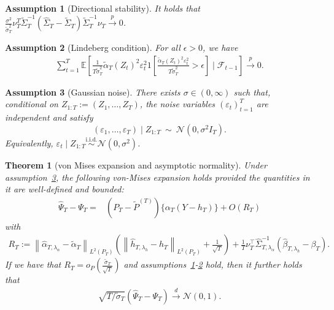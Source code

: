 \documentclass[11pt]{article}
\newtheorem{thm}{Theorem}
\newtheorem{assum}{Assumption}
\begin{document}
\begin{assum}[Directional stability]
\label{ass: directional_stab_vme}
    It holds that $\frac{\sigma^2}{\widetilde{\sigma}_T^2}\nu_T^{T}\widetilde{\Sigma}_T^{-1}(\widehat{\Sigma}_T - \widetilde{\Sigma}_T)\widetilde{\Sigma}_T^{-1}\nu_T \overset{p}{\rightarrow} 0$. 
\end{assum}
\begin{assum}[Lindeberg condition]
\label{ass: lindeberg_vme}
    For all $\epsilon > 0$, we have
\begin{align*}
    \sum_{t=1}^{T}\mathbb{E}\left[\frac{1}{T\widetilde{\sigma}_T^2}\widetilde{\alpha}_T(Z_t)^2 \varepsilon_t^2 1\left[\frac{\widetilde{\alpha}_T(Z_t)^2\varepsilon_t^2}{T\widetilde{\sigma}_T^2} > \epsilon\right]\mid \mathcal{F}_{t-1}\right] \overset{p}{\rightarrow} 0.
\end{align*}
\end{assum}
\begin{assum}[Gaussian noise]\label{ass:gauss_noise}
There exists $\sigma\in(0,\infty)$ such that, conditional on $Z_{1:T}:=(Z_1,\dots,Z_T)$,
the noise variables $(\varepsilon_t)_{t=1}^T$ are independent and satisfy
\[
(\varepsilon_1,\dots,\varepsilon_T)\mid Z_{1:T}\ \sim\ \mathcal{N}(0,\sigma^2 I_T).
\]
Equivalently, $\varepsilon_t\mid Z_{1:T}\stackrel{\text{i.i.d.}}{\sim}\mathcal{N}(0,\sigma^2)$.
\end{assum}
\begin{thm}[von Mises expansion and asymptotic normality]\label{thm:vme-and-an}
Under assumption~\ref{ass:gauss_noise}, the following von-Mises expansion holds provided the quantities in it are well-defined and bounded:
\begin{align*}
    \widehat \Psi_T - \Psi_T =& (P_T - \widetilde P^{(T)})\{\alpha_T (Y - h_T)\} + O\left(R_T \right)
\end{align*}
with
\begin{align}
    R_T := \left\|\widehat{\alpha}_{T, \lambda_\alpha} - \widetilde \alpha_T \right\|_{L^2(P_T)} \left( \left\|\widehat{h}_{T,\lambda_h} - h_T\right\|_{L^2(P_T)}  + \frac{1}{\sqrt{T}}\right) + \frac{1}{T} \nu_T^\top \widehat \Sigma_{T,\lambda_\alpha}^{-1} (\widehat{\beta}_{T,\lambda_h} - \beta_T).
\end{align}
If we have that $R_T = o_P\left(\frac{\widetilde \sigma_T}{\sqrt{T}}\right)$ and assumptions~\ref{ass: directional_stab_vme}-\ref{ass: lindeberg_vme} hold, then
it further holds that 
\begin{align*}
    \sqrt{T / \widetilde \sigma_T} \left( \widehat \Psi_T - \Psi_T  \right) \xrightarrow{d} \mathcal{N}(0,1).
\end{align*}
\end{thm}
\end{document}
